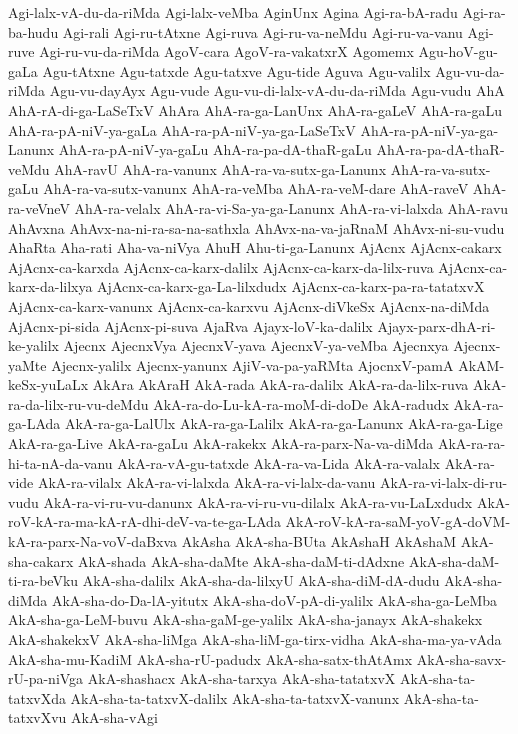 {Agi-lalx-vA-du-da-riMda
Agi-lalx-veMba
AginUnx
Agina
Agi-ra-bA-radu
Agi-ra-ba-hudu
Agi-rali
Agi-ru-tAtxne
Agi-ruva
Agi-ru-va-neMdu
Agi-ru-va-vanu
Agi-ruve
Agi-ru-vu-da-riMda
AgoV-cara
AgoV-ra-vakatxrX
Agomemx
Agu-hoV-gu-gaLa
Agu-tAtxne
Agu-tatxde
Agu-tatxve
Agu-tide
Aguva
Agu-valilx
Agu-vu-da-riMda
Agu-vu-dayAyx
Agu-vude
Agu-vu-di-lalx-vA-du-da-riMda
Agu-vudu
AhA
AhA-rA-di-ga-LaSeTxV
AhAra
AhA-ra-ga-LanUnx
AhA-ra-gaLeV
AhA-ra-gaLu
AhA-ra-pA-niV-ya-gaLa
AhA-ra-pA-niV-ya-ga-LaSeTxV
AhA-ra-pA-niV-ya-ga-Lanunx
AhA-ra-pA-niV-ya-gaLu
AhA-ra-pa-dA-thaR-gaLu
AhA-ra-pa-dA-thaR-veMdu
AhA-ravU
AhA-ra-vanunx
AhA-ra-va-sutx-ga-Lanunx
AhA-ra-va-sutx-gaLu
AhA-ra-va-sutx-vanunx
AhA-ra-veMba
AhA-ra-veM-dare
AhA-raveV
AhA-ra-veVneV
AhA-ra-velalx
AhA-ra-vi-Sa-ya-ga-Lanunx
AhA-ra-vi-lalxda
AhA-ravu
AhAvxna
AhAvx-na-ni-ra-sa-na-sathxla
AhAvx-na-va-jaRnaM
AhAvx-ni-su-vudu
AhaRta
Aha-rati
Aha-va-niVya
AhuH
Ahu-ti-ga-Lanunx
AjAcnx
AjAcnx-cakarx
AjAcnx-ca-karxda
AjAcnx-ca-karx-dalilx
AjAcnx-ca-karx-da-lilx-ruva
AjAcnx-ca-karx-da-lilxya
AjAcnx-ca-karx-ga-La-lilxdudx
AjAcnx-ca-karx-pa-ra-tatatxvX
AjAcnx-ca-karx-vanunx
AjAcnx-ca-karxvu
AjAcnx-diVkeSx
AjAcnx-na-diMda
AjAcnx-pi-sida
AjAcnx-pi-suva
AjaRva
Ajayx-loV-ka-dalilx
Ajayx-parx-dhA-ri-ke-yalilx
Ajecnx
AjecnxVya
AjecnxV-yava
AjecnxV-ya-veMba
Ajecnxya
Ajecnx-yaMte
Ajecnx-yalilx
Ajecnx-yanunx
AjiV-va-pa-yaRMta
AjocnxV-pamA
AkAM-keSx-yuLaLx
AkAra
AkAraH
AkA-rada
AkA-ra-dalilx
AkA-ra-da-lilx-ruva
AkA-ra-da-lilx-ru-vu-deMdu
AkA-ra-do-Lu-kA-ra-moM-di-doDe
AkA-radudx
AkA-ra-ga-LAda
AkA-ra-ga-LalUlx
AkA-ra-ga-Lalilx
AkA-ra-ga-Lanunx
AkA-ra-ga-Lige
AkA-ra-ga-Live
AkA-ra-gaLu
AkA-rakekx
AkA-ra-parx-Na-va-diMda
AkA-ra-ra-hi-ta-nA-da-vanu
AkA-ra-vA-gu-tatxde
AkA-ra-va-Lida
AkA-ra-valalx
AkA-ra-vide
AkA-ra-vilalx
AkA-ra-vi-lalxda
AkA-ra-vi-lalx-da-vanu
AkA-ra-vi-lalx-di-ru-vudu
AkA-ra-vi-ru-vu-danunx
AkA-ra-vi-ru-vu-dilalx
AkA-ra-vu-LaLxdudx
AkA-roV-kA-ra-ma-kA-rA-dhi-deV-va-te-ga-LAda
AkA-roV-kA-ra-saM-yoV-gA-doVM-kA-ra-parx-Na-voV-daBxva
AkAsha
AkA-sha-BUta
AkAshaH
AkAshaM
AkA-sha-cakarx
AkA-shada
AkA-sha-daMte
AkA-sha-daM-ti-dAdxne
AkA-sha-daM-ti-ra-beVku
AkA-sha-dalilx
AkA-sha-da-lilxyU
AkA-sha-diM-dA-dudu
AkA-sha-diMda
AkA-sha-do-Da-lA-yitutx
AkA-sha-doV-pA-di-yalilx
AkA-sha-ga-LeMba
AkA-sha-ga-LeM-buvu
AkA-sha-gaM-ge-yalilx
AkA-sha-janayx
AkA-shakekx
AkA-shakekxV
AkA-sha-liMga
AkA-sha-liM-ga-tirx-vidha
AkA-sha-ma-ya-vAda
AkA-sha-mu-KadiM
AkA-sha-rU-padudx
AkA-sha-satx-thAtAmx
AkA-sha-savx-rU-pa-niVga
AkA-shashacx
AkA-sha-tarxya
AkA-sha-tatatxvX
AkA-sha-ta-tatxvXda
AkA-sha-ta-tatxvX-dalilx
AkA-sha-ta-tatxvX-vanunx
AkA-sha-ta-tatxvXvu
AkA-sha-vAgi
}
